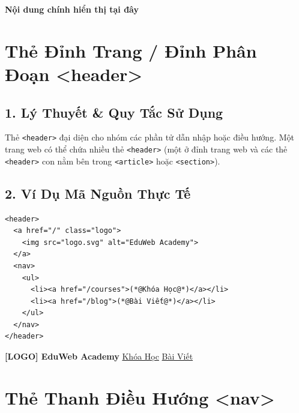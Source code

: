 \documentclass[11pt,oneside]{book}
\newcommand{\codeinline}[1]{\textcolor{accentOrange}{\texttt{#1}}}
\begin{document}
\begin{browserWindow}
\sffamily
{\Huge\bfseries Nội dung chính hiển thị tại đây}
\end{browserWindow}

\section{Thẻ Đỉnh Trang / Đỉnh Phân Đoạn <header>}
\subsection{1. Lý Thuyết \& Quy Tắc Sử Dụng}
Thẻ \codeinline{<header>} đại diện cho nhóm các phần tử dẫn nhập hoặc điều hướng. Một trang web có thể chứa nhiều thẻ \codeinline{<header>} (một ở đỉnh trang web và các thẻ \codeinline{<header>} con nằm bên trong \codeinline{<article>} hoặc \codeinline{<section>}).

\subsection{2. Ví Dụ Mã Nguồn Thực Tế}
\begin{codeWindow}
\begin{lstlisting}[language=HTML5]
<header>
  <a href="/" class="logo">
    <img src="logo.svg" alt="EduWeb Academy">
  </a>
  <nav>
    <ul>
      <li><a href="/courses">(*@Khóa Học@*)</a></li>
      <li><a href="/blog">(*@Bài Viết@*)</a></li>
    </ul>
  </nav>
</header>
\end{lstlisting}
\end{codeWindow}

\begin{browserWindow}
\sffamily\small
\begin{tcolorbox}[colback=primaryBlue!5, colframe=primaryBlue!30, arc=5pt, boxsep=3pt, left=12pt, right=12pt, top=6pt, bottom=6pt]
\textcolor{primaryBlue}{\bfseries [LOGO] EduWeb Academy} \hfill \textcolor{primaryBlue}{\underline{Khóa Học}} \quad \textcolor{primaryBlue}{\underline{Bài Viết}}
\end{tcolorbox}
\end{browserWindow}

\section{Thẻ Thanh Điều Hướng <nav>}
\end{document}
